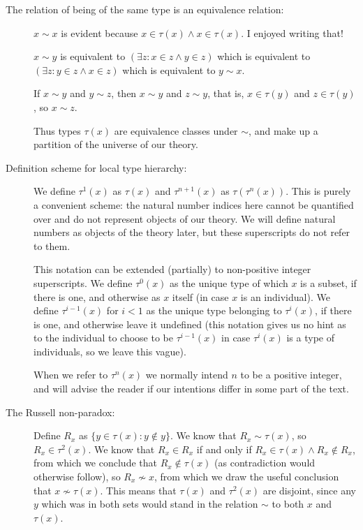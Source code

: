 \documentclass[12pt]{article}
\begin{document}
\begin{description}

\item[The relation of being of the same type is an equivalence relation:]  $x \sim x$ is evident because $x \in \tau(x) \wedge x \in \tau(x)$.  I enjoyed writing that!

$x \sim y$ is equivalent to $(\exists z: x \in z \wedge y \in z)$ which is equivalent to $(\exists z:y \in z \wedge x \in z)$ which is equivalent to $y \sim x$.

If $x \sim y$ and $y \sim z$, then $x \sim y$ and $z \sim y$, that is, $x \in \tau(y)$ and $z \in \tau(y)$, so $x \sim z$.

Thus types $\tau(x)$ are equivalence classes under $\sim$, and make up a partition of the universe of our theory.

\item[Definition scheme for local type hierarchy:]  We define $\tau^1(x)$ as $\tau(x)$ and $\tau^{n+1}(x)$ as $\tau(\tau^n(x))$.  This is purely a convenient scheme:  the natural number indices here cannot be quantified over and do not represent objects of our theory.  We will define natural numbers as objects of the theory later, but these superscripts do not refer to them.

This notation can be extended (partially) to non-positive integer superscripts.   We define $\tau^0(x)$ as the unique type of which $x$ is a subset, if there is one, and otherwise as $x$ itself (in case $x$ is an individual).  We define $\tau^{i-1}(x)$ for $i<1$ as the unique type belonging to $\tau^i(x)$, if there is one, and otherwise leave it undefined (this notation gives us no hint
as to the individual to choose to be $\tau^{i-1}(x)$ in case $\tau^i(x)$ is a type of individuals, so we leave this vague).

When we refer to $\tau^n(x)$ we normally intend $n$ to be a positive integer, and will advise the reader if our intentions differ in some part of the text.

\item[The Russell non-paradox:]  Define $R_x$ as $\{y \in \tau(x):y \not\in y\}$.  We know that $R_x \sim \tau(x)$, so
$R_x \in \tau^2(x)$.  We know that $R_x \in R_x$ if and only if $R_x \in \tau(x) \wedge R_x \not\in R_x$, from which we conclude that $R_x \not\in \tau(x)$ (as contradiction would otherwise follow), so $R_x \not\sim x$, from which we draw the useful conclusion that $x \not\sim \tau(x)$.  This means that $\tau(x)$ and $\tau^2(x)$ are disjoint, 
since any $y$ which was in both sets would stand in the relation $\sim$ to both $x$ and $\tau(x)$.  


\end{description}
\end{document}
